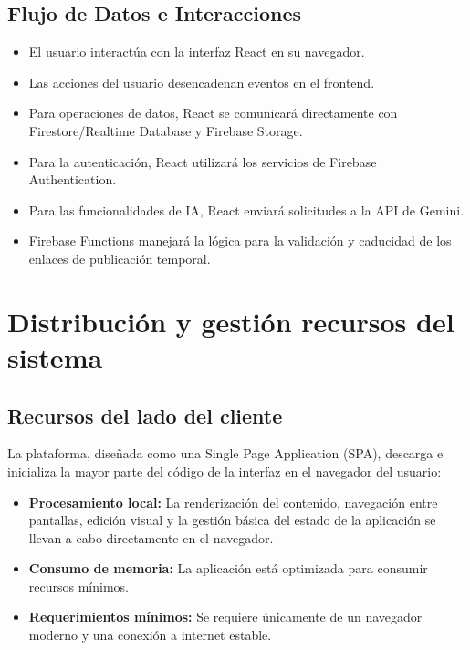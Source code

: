 \documentclass[12pt,a4paper]{report}
\begin{document}
\subsection{Flujo de Datos e Interacciones}

\begin{itemize}
\item El usuario interactúa con la interfaz React en su navegador.
\item Las acciones del usuario desencadenan eventos en el frontend.
\item Para operaciones de datos, React se comunicará directamente con Firestore/Realtime Database y Firebase Storage.
\item Para la autenticación, React utilizará los servicios de Firebase Authentication.
\item Para las funcionalidades de IA, React enviará solicitudes a la API de Gemini.
\item Firebase Functions manejará la lógica para la validación y caducidad de los enlaces de publicación temporal.
\end{itemize}

\section{Distribución y gestión recursos del sistema}

\subsection{Recursos del lado del cliente}

La plataforma, diseñada como una Single Page Application (SPA), descarga e inicializa la mayor parte del código de la interfaz en el navegador del usuario:

\begin{itemize}
\item \textbf{Procesamiento local:} La renderización del contenido, navegación entre pantallas, edición visual y la gestión básica del estado de la aplicación se llevan a cabo directamente en el navegador.

\item \textbf{Consumo de memoria:} La aplicación está optimizada para consumir recursos mínimos.

\item \textbf{Requerimientos mínimos:} Se requiere únicamente de un navegador moderno y una conexión a internet estable.
\end{itemize}
\end{document}
